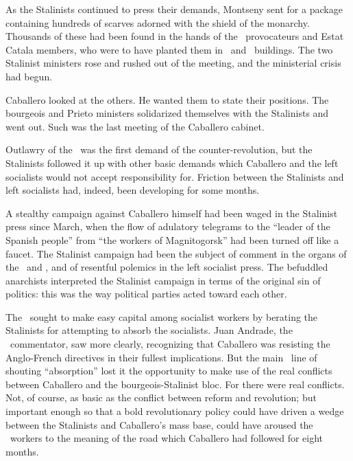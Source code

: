 As the Stalinists continued to press their demands, Montseny sent for a package containing hundreds of scarves adorned with the shield of the monarchy. Thousands of these had been found in the hands of the \PSUC\ provocateurs and Estat Catala members, who were to have planted them in \POUM\ and \CNT\ buildings. The two Stalinist ministers rose and rushed out of the meeting, and the ministerial crisis had begun.

Caballero looked at the others. He wanted them to state their positions. The bourgeois and Prieto ministers solidarized themselves with the Stalinists and went out. Such was the last meeting of the Caballero cabinet.

\dinkus

\begin{sloppypar}
Outlawry of the \POUM\ was the first demand of the counter-revolution, but the Stalinists followed it up with other basic demands which Caballero and the left socialists would not accept responsibility for.
Friction between the Stalinists and left socialists had, indeed, been developing for some months.
\end{sloppypar}

A stealthy campaign against Caballero himself had been waged in the Stalinist press since March, when the flow of adulatory telegrams to the ``leader of the Spanish people'' from ``the workers of Magnitogorsk'' had been turned off like a faucet. The Stalinist campaign had been the subject of comment in the organs of the \CNT\ and \POUM, and of resentful polemics in the left socialist press. The befuddled anarchists interpreted the Stalinist campaign in terms of the original sin of politics: this was the way political parties acted toward each other.

The \POUM\ sought to make easy capital among socialist workers by berating the Stalinists for attempting to absorb the socialists. Juan Andrade, the \POUM\ commentator, saw more clearly, recognizing that Caballero was resisting the Anglo-French directives in their fullest implications. But the main \POUM\ line of shouting ``absorption'' lost it the opportunity to make use of the real conflicts between Caballero and the bourgeois-Stalinist bloc. For there were real conflicts. Not, of course, as basic as the conflict between reform and revolution; but important enough so that a bold revolutionary policy could have driven a wedge between the Stalinists and Caballero’s mass base, could have aroused the \UGT\ workers to the meaning of the road which Caballero had followed for eight months.

